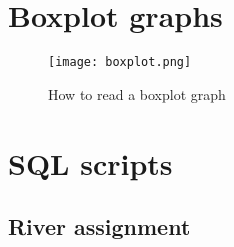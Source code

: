 \appendix
\chapter{Boxplot graphs}
\label{app:boxplot}

\begin{figure}[H]
\centering
\texttt{[image: boxplot.png]}
\caption[How to read a boxplot graph]{How to read a boxplot graph \cite{stk_boxplot}}
\label{boxlot}
\end{figure}

\chapter{SQL scripts}
\section{River assignment}
\label{app:sql_assign_river}


%            

